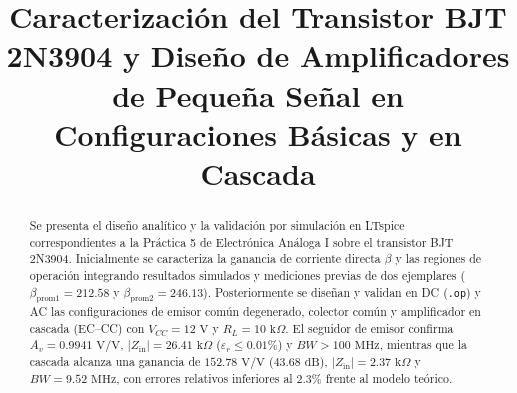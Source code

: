 \documentclass[conference]{IEEEtran}
\begin{document}
\title{Caracterizaci\'on del Transistor BJT 2N3904 y Dise\~no de Amplificadores de Peque\~na Se\~nal en Configuraciones B\'asicas y en Cascada}

\author{
\and
{}
\and
{}
}

\maketitle

\begin{abstract}
Se presenta el dise\~no anal\'itico y la validaci\'on por simulaci\'on en LTspice correspondientes a la Pr\'actica 5 de Electr\'onica An\'aloga I sobre el transistor BJT 2N3904. Inicialmente se caracteriza la ganancia de corriente directa $\beta$ y las regiones de operaci\'on integrando resultados simulados y mediciones previas de dos ejemplares ($\beta_{\mathrm{prom1}} = 212.58$ y $\beta_{\mathrm{prom2}} = 246.13$). Posteriormente se dise\~nan y validan en DC (\texttt{.op}) y AC las configuraciones de emisor com\'un degenerado, colector com\'un y amplificador en cascada (EC--CC) con $V_{CC} = 12\text{ V}$ y $R_L = 10\text{ k}\Omega$.
El seguidor de emisor confirma $A_v = 0.9941\text{ V/V}$, $|Z_{\mathrm{in}}| = 26.41\text{ k}\Omega$ ($\varepsilon_r \le 0.01\%$) y $BW > 100\text{ MHz}$, mientras que la cascada alcanza una ganancia de $152.78\text{ V/V}$ ($43.68\text{ dB}$), $|Z_{\mathrm{in}}| = 2.37\text{ k}\Omega$ y $BW = 9.52\text{ MHz}$, con errores relativos inferiores al $2.3\%$ frente al modelo te\'orico.
\end{abstract}
\end{document}
